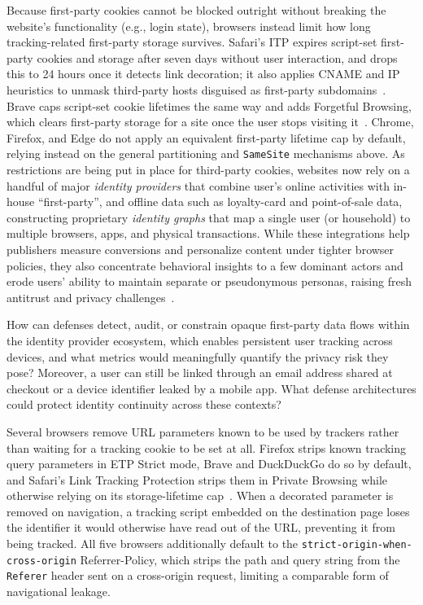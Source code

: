 %
Because first-party cookies cannot be blocked outright without breaking the website's functionality (e.g., login state), browsers instead limit how long tracking-related first-party storage survives.
%
Safari's ITP expires script-set first-party cookies and storage after seven days without user interaction, and drops this to 24 hours once it detects link decoration; it also applies CNAME and IP heuristics to unmask third-party hosts disguised as first-party subdomains~\cite{TrackingPreventionWebKit2020}.
%
Brave caps script-set cookie lifetimes the same way and adds Forgetful Browsing, which clears first-party storage for a site once the user stops visiting it~\cite{bravePrivacyProtectionSecurity}.
%
Chrome, Firefox, and Edge do not apply an equivalent first-party lifetime cap by default, relying instead on the general partitioning and \texttt{SameSite} mechanisms above.
%
As restrictions are being put in place for third-party cookies, websites now rely on a handful of major \emph{identity providers} that combine user's online activities with in-house ``first-party'', and offline data such as loyalty-card and point-of-sale data, constructing proprietary \emph{identity graphs} that map a single user (or household) to multiple browsers, apps, and physical transactions.
%
While these integrations help publishers measure conversions and personalize content under tighter browser policies, they also concentrate behavioral insights to a few dominant actors and erode users’ ability to maintain separate or pseudonymous personas, raising fresh antitrust and privacy challenges~\cite{TargetedAdvertisingAutorite2025,khanAmazonsAntitrustParadox2017,munirGooglesChromeAntitrust2024}.

\begin{opbox}
How can defenses detect, audit, or constrain opaque first-party data flows within the identity provider ecosystem, which enables persistent user tracking across devices, and what metrics would meaningfully quantify the privacy risk they pose? Moreover, a user can still be linked through an email address shared at checkout or a device identifier leaked by a mobile app. What defense architectures could protect identity continuity across these contexts?
\end{opbox}


%
Several browsers remove URL parameters known to be used by trackers rather than waiting for a tracking cookie to be set at all. 
%
Firefox strips known tracking query parameters in ETP Strict mode, Brave and DuckDuckGo do so by default, and Safari's Link Tracking Protection strips them in Private Browsing while otherwise relying on its storage-lifetime cap~\cite{TrackingPreventionWebKit2020}.
%
When a decorated parameter is removed on navigation, a tracking script embedded on the destination page loses the identifier it would otherwise have read out of the URL, preventing it from being tracked.
%
All five browsers additionally default to the \texttt{strict-origin-when-cross-origin} Referrer-Policy, which strips the path and query string from the \texttt{Referer} header sent on a cross-origin request, limiting a comparable form of navigational leakage.



